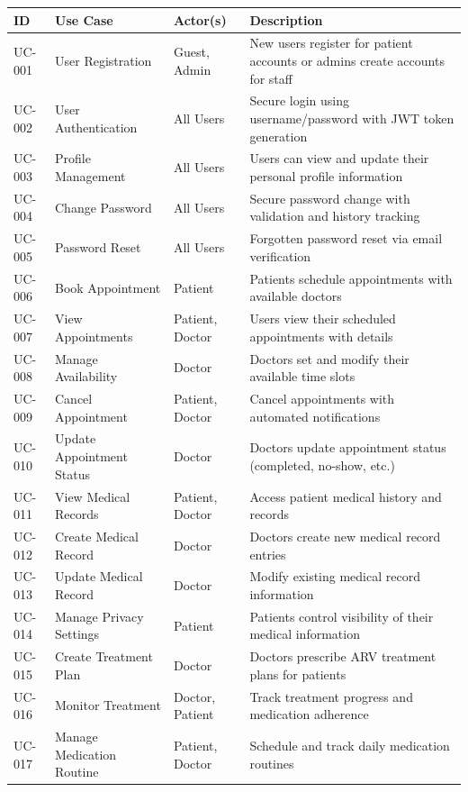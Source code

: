 \documentclass[12pt,a4paper]{article}
\begin{document}
\begin{longtable}{|p{1cm}|p{3cm}|p{3cm}|p{7cm}|}
\hline
\textbf{ID} & \textbf{Use Case} & \textbf{Actor(s)} & \textbf{Description} \\
\hline
UC-001 & User Registration & Guest, Admin & New users register for patient accounts or admins create accounts for staff \\
\hline
UC-002 & User Authentication & All Users & Secure login using username/password with JWT token generation \\
\hline
UC-003 & Profile Management & All Users & Users can view and update their personal profile information \\
\hline
UC-004 & Change Password & All Users & Secure password change with validation and history tracking \\
\hline
UC-005 & Password Reset & All Users & Forgotten password reset via email verification \\
\hline
UC-006 & Book Appointment & Patient & Patients schedule appointments with available doctors \\
\hline
UC-007 & View Appointments & Patient, Doctor & Users view their scheduled appointments with details \\
\hline
UC-008 & Manage Availability & Doctor & Doctors set and modify their available time slots \\
\hline
UC-009 & Cancel Appointment & Patient, Doctor & Cancel appointments with automated notifications \\
\hline
UC-010 & Update Appointment Status & Doctor & Doctors update appointment status (completed, no-show, etc.) \\
\hline
UC-011 & View Medical Records & Patient, Doctor & Access patient medical history and records \\
\hline
UC-012 & Create Medical Record & Doctor & Doctors create new medical record entries \\
\hline
UC-013 & Update Medical Record & Doctor & Modify existing medical record information \\
\hline
UC-014 & Manage Privacy Settings & Patient & Patients control visibility of their medical information \\
\hline
UC-015 & Create Treatment Plan & Doctor & Doctors prescribe ARV treatment plans for patients \\
\hline
UC-016 & Monitor Treatment & Doctor, Patient & Track treatment progress and medication adherence \\
\hline
UC-017 & Manage Medication Routine & Patient, Doctor & Schedule and track daily medication routines \\

\end{longtable}
\end{document}
